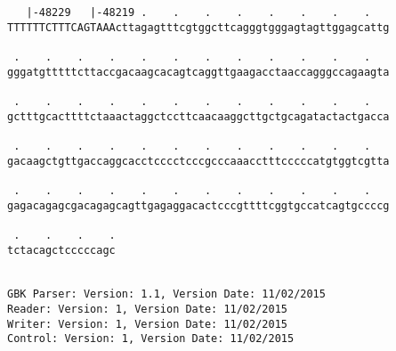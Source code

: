 \documentclass{article}
\begin{document}
\begin{Verbatim}
   |-48229   |-48219 .    .    .    .    .    .    .    .   
TTTTTTCTTTCAGTAAActtagagtttcgtggcttcagggtgggagtagttggagcattg
                                                            
 .    .    .    .    .    .    .    .    .    .    .    .   
gggatgtttttcttaccgacaagcacagtcaggttgaagacctaaccagggccagaagta
                                                            
 .    .    .    .    .    .    .    .    .    .    .    .   
gctttgcacttttctaaactaggctccttcaacaaggcttgctgcagatactactgacca
                                                            
 .    .    .    .    .    .    .    .    .    .    .    .   
gacaagctgttgaccaggcacctcccctcccgcccaaacctttcccccatgtggtcgtta
                                                            
 .    .    .    .    .    .    .    .    .    .    .    .   
gagacagagcgacagagcagttgagaggacactcccgttttcggtgccatcagtgccccg
                                                            
 .    .    .    .
tctacagctcccccagc
                 
                 
GBK Parser: Version: 1.1, Version Date: 11/02/2015
Reader: Version: 1, Version Date: 11/02/2015
Writer: Version: 1, Version Date: 11/02/2015
Control: Version: 1, Version Date: 11/02/2015
\end{Verbatim}
\end{document}
